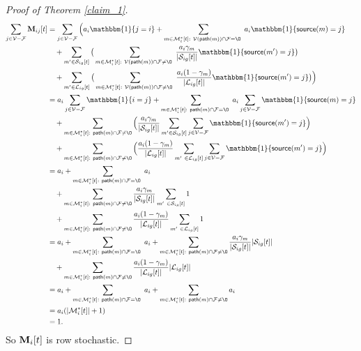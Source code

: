 \documentclass[letterpaper, 11pt]{article}
\newcommand{\calF}{{\mathcal{F}}}
\newcommand{\calL}{{\mathcal{L}}}
\newcommand{\calM}{{\mathcal{M}}}
\newcommand{\calS}{{\mathcal{S}}}
\newcommand{\calV}{{\mathcal{V}}}
\begin{document}
\begin{proof}[Proof of Theorem \ref{claim_1}]
\begin{align*}
      \sum_{j\in \calV-\calF}{\bf{M}}_{ij}[t]&=\sum_{j\in \calV-\calF}
      \Big{(} a_i\mathbbm{1}\{j=i\}+
\sum_{m\in \calM_i^*[t]:~\calV(\mathsf{path}(m))\cap \calF=\O~}a_i\mathbbm{1}\{\mathsf{source}(m)=j\}\\
&\quad +\sum_{m^{\prime}\in \calS_{ig}[t]}\big{(}\sum_{m\in \calM_i^*[t]:~\calV(\mathsf{path}(m))\cap \calF\not=\O~}
\frac{a_i\gamma_{m}}{|\calS_{ig}[t]|}\mathbbm{1}\{\mathsf{source}(m^{\prime})=j\}\big{)}\\
&\quad+
\sum_{m^{\prime}\in \calL_{ig}[t]}\big{(}\sum_{m\in \calM_i^*[t]:~\calV(\mathsf{path}(m))\cap \calF\not=\O~}\frac{a_i(1-\gamma_{m})}{|\calL_{ig}[t]|}\mathbbm{1}\{\mathsf{source}(m^{\prime})=j\}\big{)}\Big{)}\\
      &=a_i\sum_{j\in \calV-\calF}\mathbbm{1}\{i=j\}+\sum_{m\in \calM_i^*[t]:~\mathsf{path}(m)\cap \calF=\O~}a_i \sum_{j\in \calV-\calF}\mathbbm{1}\{ \mathsf{source}(m)=j\}\\
      &\quad+\sum_{m\in \calM_i^*[t]:~\mathsf{path}(m)\cap \calF\not=\O}\Big{(}\frac{a_i\gamma_m}{|\calS_{ig}[t]|} \sum_{ m^{\prime}\in \calS_{ig}[t]}\sum_{j\in \calV-\calF}\mathbbm{1}\{ \mathsf{source}(m^{\prime})=j\}\Big{)}\\
      &\quad + \sum_{m\in \calM_i^*[t]:~\mathsf{path}(m)\cap \calF\not=\O}\Big{(}\frac{a_i(1-\gamma_m)}{|\calL_{ig}[t]|}\sum_{m^{\prime}~\in \calL_{ig}[t]}\sum_{j\in \calV-\calF}\mathbbm{1}\{\mathsf{source}(m^{\prime})=j\}\Big{)}\\
      &=a_i+\sum_{m\in \calM_i^*[t]:~\mathsf{path}(m)\cap \calF=\O~}a_i\\
      &\quad+\sum_{m\in \calM_i^*[t]:~\mathsf{path}(m)\cap \calF\not=\O} \frac{a_i\gamma_m}{|\calS_{ig}[t]|} \sum_{m^{\prime}~\in \calS_{ig}[t]}1\\
      &\quad + \sum_{m\in \calM_i^*[t]:~\mathsf{path}(m)\cap \calF\not=\O}\frac{a_i(1-\gamma_m)}{|\calL_{ig}[t]|}\sum_{m^{\prime}~\in \calL_{ig}[t]}1\\
      &=a_i+\sum_{m\in \calM_i^*[t]:~\mathsf{path}(m)\cap \calF=\O~}a_i+\sum_{m\in \calM_i^*[t]:~\mathsf{path}(m)\cap \calF\not=\O} \frac{a_i\gamma_m}{|\calS_{ig}[t]|} |\calS_{ig}[t]|\\
      &\quad + \sum_{m\in \calM_i^*[t]:~\mathsf{path}(m)\cap \calF\not=\O}\frac{a_i(1-\gamma_m)}{|\calL_{ig}[t]|}|\calL_{ig}[t]|\\
      &=a_i+\sum_{m\in \calM_i^*[t]:~\mathsf{path}(m)\cap \calF=\O~}a_i+\sum_{m\in \calM_i^*[t]:~\mathsf{path}(m)\cap \calF\not=\O}a_i\\
      &=a_i(|\calM^*_i[t]|+1)\\
      &=1.
\end{align*}
So ${\bf{M}}_{i}[t]$ is row stochastic.


\end{proof}
\end{document}
